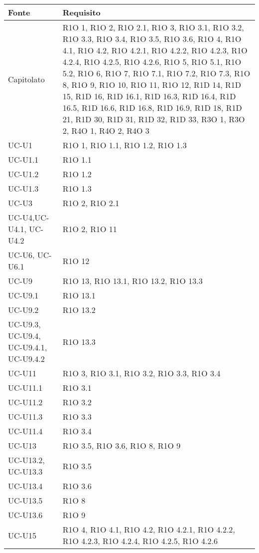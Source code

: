 \begin{center}
  \bgroup
  \def\arraystretch{1.8}
  \begin{longtable}{ |  p{5cm} | p{5cm} |}
    \hline
    \cellcolor[gray]{0.9} \textbf{Fonte} &   
    \cellcolor[gray]{0.9} \textbf{Requisito}\\ \hline
    Capitolato & R1O 1, R1O 2, R1O 2.1, R1O 3, R1O 3.1, R1O 3.2, R1O 3.3, R1O 3.4, R1O 3.5, R1O 3.6, R1O 4, R1O 4.1, R1O 4.2, R1O 4.2.1, R1O 4.2.2, R1O 4.2.3, R1O 4.2.4, R1O 4.2.5, R1O 4.2.6, R1O 5, R1O 5.1, R1O 5.2, R1O 6, R1O 7, R1O 7.1, R1O 7.2, R1O 7.3, R1O 8, R1O 9, R1O 10, R1O 11, R1O 12, R1D 14, R1D 15, R1D 16, R1D 16.1, R1D 16.3, R1D 16.4, R1D 16.5, R1D 16.6, R1D 16.8, R1D 16.9, R1D 18, R1D 21, R1D 30, R1D 31, R1D 32, R1D 33, R3O 1, R3O 2, R4O 1, R4O 2, R4O 3 \\ \hline
    UC-U1 & R1O 1, R1O 1.1, R1O 1.2, R1O 1.3  \\ \hline
    UC-U1.1 & R1O 1.1  \\ \hline
    UC-U1.2 & R1O 1.2  \\ \hline
    UC-U1.3 & R1O 1.3  \\ \hline
    UC-U3 & R1O 2, R1O 2.1  \\ \hline
    UC-U4,UC-U4.1, UC-U4.2 & R1O 2, R1O 11 \\ \hline
    UC-U6, UC-U6.1 & R1O 12  \\ \hline
    UC-U9 & R1O 13, R1O 13.1, R1O 13.2, R1O 13.3  \\ \hline
    UC-U9.1 & R1O 13.1  \\ \hline
    UC-U9.2 & R1O 13.2  \\ \hline
    UC-U9.3, UC-U9.4, UC-U9.4.1, UC-U9.4.2 & R1O 13.3  \\ \hline
    UC-U11 & R1O 3, R1O 3.1, R1O 3.2, R1O 3.3, R1O 3.4  \\ \hline
    UC-U11.1 & R1O 3.1  \\ \hline
    UC-U11.2 & R1O 3.2  \\ \hline
    UC-U11.3 & R1O 3.3  \\ \hline
    UC-U11.4 & R1O 3.4  \\ \hline
    UC-U13 & R1O 3.5, R1O 3.6, R1O 8, R1O 9  \\ \hline
    UC-U13.2, UC-U13.3 & R1O 3.5  \\ \hline
    UC-U13.4 & R1O 3.6  \\ \hline
    UC-U13.5 & R1O 8  \\ \hline
    UC-U13.6 & R1O 9  \\ \hline
    UC-U15 & R1O 4, R1O 4.1, R1O 4.2, R1O 4.2.1, R1O 4.2.2, R1O 4.2.3, R1O 4.2.4, R1O 4.2.5, R1O 4.2.6  \\ \hline

\end{longtable}
\end{center}
